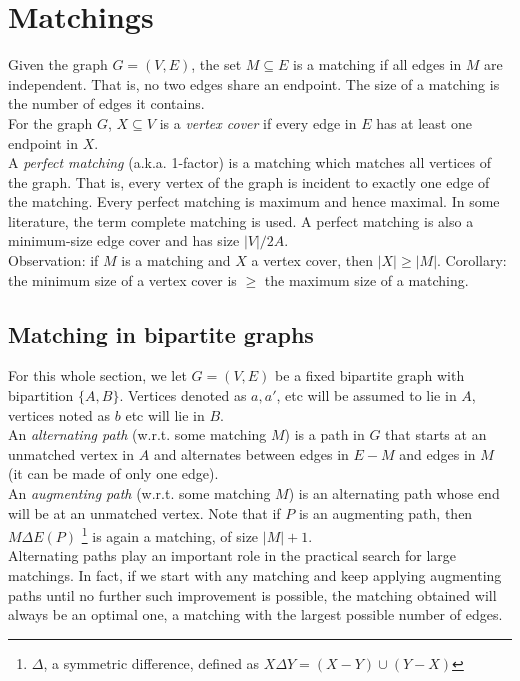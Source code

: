 
\chapter{Matchings}
Given the graph $G = (V, E)$, the set $M \subseteq E$ is a matching if all edges in $M$ are independent. That is, no two edges share an endpoint. The size of a matching is the number of edges it contains.\\

For the graph $G$, $X \subseteq V$ is a \textit{vertex cover} if every edge in $E$ has at least one endpoint in $X$.\\

A \textit{perfect matching} (a.k.a. 1-factor) is a matching which matches all vertices of the graph. That is, every vertex of the graph is incident to exactly one edge of the matching. Every perfect matching is maximum and hence maximal. In some literature, the term complete matching is used. A perfect matching is also a minimum-size edge cover and has size $|V|/2A$. \\

Observation: if $M$ is a matching and $X$ a vertex cover, then $|X| \geq |M|$. Corollary: the minimum size of a vertex cover is $\geq$ the maximum size of a matching.

\section{Matching in bipartite graphs}
For this whole section, we let $G = (V, E)$ be a fixed bipartite graph with bipartition $\{A, B \}$. Vertices denoted as $a, a'$, etc will be assumed to lie in $A$, vertices noted as $b$ etc will lie in $B$.\\

An \textit{alternating path} (w.r.t. some matching $M$) is a path in $G$ that starts at an unmatched vertex in $A$ and alternates between edges in $E-M$ and edges in $M$ (it can be made of only one edge).\\

An \textit{augmenting path} (w.r.t. some matching $M$) is an alternating path whose end will be at an unmatched vertex. Note that if $P$ is an augmenting path, then $M \Delta E(P)$ \footnote{$\Delta$, a symmetric difference, defined as $X \Delta Y = (X-Y) \cup (Y-X)$} is again a matching, of size $|M| + 1$. \\

Alternating paths play an important role in the practical search for large matchings. In fact, if we start with any matching and keep applying augmenting paths until no further such improvement is possible, the matching obtained will always be an optimal one, a matching with the largest possible number of edges.

